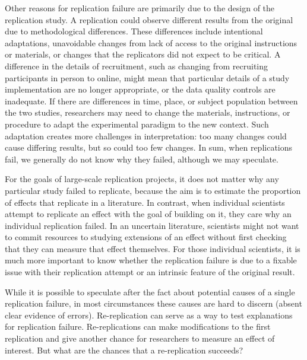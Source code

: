 \documentclass[
  english,
  a4paper,
]{article}
\begin{document}
Other reasons for replication failure are primarily due to the design of the replication study.
A replication could observe different results from the original due to methodological differences.
These differences include intentional adaptations, unavoidable changes from lack of access to the original instructions or materials, or changes that the replicators did not expect to be critical.
A difference in the details of recruitment, such as changing from recruiting participants in person to online, might mean that particular details of a study implementation are no longer appropriate, or the data quality controls are inadequate.
If there are differences in time, place, or subject population between the two studies, researchers may need to change the materials, instructions, or procedure to adapt the experimental paradigm to the new context.
Such adaptation creates more challenges in interpretation: too many changes could cause differing results, but so could too few changes.
In sum, when replications fail, we generally do not know why they failed, although we may speculate.

For the goals of large-scale replication projects, it does not matter why any particular study failed to replicate, because the aim is to estimate the proportion of effects that replicate in a literature.
In contrast, when individual scientists attempt to replicate an effect with the goal of building on it, they care why an individual replication failed.
In an uncertain literature, scientists might not want to commit resources to studying extensions of an effect without first checking that they can measure that effect themselves.
For those individual scientists, it is much more important to know whether the replication failure is due to a fixable issue with their replication attempt or an intrinsic feature of the original result.

While it is possible to speculate after the fact about potential causes of a single replication failure, in most circumstances these causes are hard to discern (absent clear evidence of errors).
Re-replication can serve as a way to test explanations for replication failure.
Re-replications can make modifications to the first replication and give another chance for researchers to measure an effect of interest.
But what are the chances that a re-replication succeeds?
\end{document}
